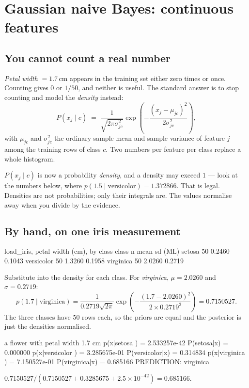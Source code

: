 \documentclass[11pt]{article}
\begin{document}
\section{Gaussian naive Bayes: continuous features}
\label{sec:gauss}

\subsection{You cannot count a real number}

\emph{Petal width} $= 1.7$\,cm appears in the training set either zero times
or once. Counting gives $0$ or $1/50$, and neither is useful. The standard
answer is to stop counting and model the \emph{density} instead:
\[
  P(x_j \mid c) \;=\; \frac{1}{\sqrt{2\pi\sigma_{jc}^{2}}}
    \exp\!\left(-\frac{(x_j - \mu_{jc})^{2}}{2\sigma_{jc}^{2}}\right),
\]
with $\mu_{jc}$ and $\sigma^2_{jc}$ the ordinary sample mean and sample
variance of feature $j$ among the training rows of class $c$. Two numbers
per feature per class replace a whole histogram.

\begin{caution}
$P(x_j \mid c)$ is now a probability \emph{density}, and a density may exceed
$1$ --- look at the numbers below, where $p(1.5 \mid \text{versicolor}) =
1.372866$. That is legal. Densities are not probabilities; only their
integrals are. The values normalise away when you divide by the evidence.
\end{caution}

\subsection{By hand, on one iris measurement}

\begin{codeout}
load_iris, petal width (cm), by class
   class          n      mean   sd (ML)
   setosa        50    0.2460    0.1043
   versicolor    50    1.3260    0.1958
   virginica     50    2.0260    0.2719
\end{codeout}

\begin{worked}
Substitute into the density for each class. For \emph{virginica},
$\mu = 2.0260$ and $\sigma = 0.2719$:
\[
  p(1.7 \mid \text{virginica})
    = \frac{1}{0.2719\sqrt{2\pi}}
      \exp\!\left(-\frac{(1.7 - 2.0260)^2}{2 \times 0.2719^2}\right)
    = 0.7150527 .
\]
The three classes have $50$ rows each, so the priors are equal and the
posterior is just the densities normalised.
\begin{codeout}
   a flower with petal width 1.7 cm
      p(x|setosa     ) = 2.533257e-42   P(setosa|x) = 0.000000
      p(x|versicolor ) = 3.285675e-01   P(versicolor|x) = 0.314834
      p(x|virginica  ) = 7.150527e-01   P(virginica|x) = 0.685166
      PREDICTION: virginica
\end{codeout}
$0.7150527 / (0.7150527 + 0.3285675 + 2.5\times10^{-42}) = 0.685166$.
\end{worked}
\end{document}
